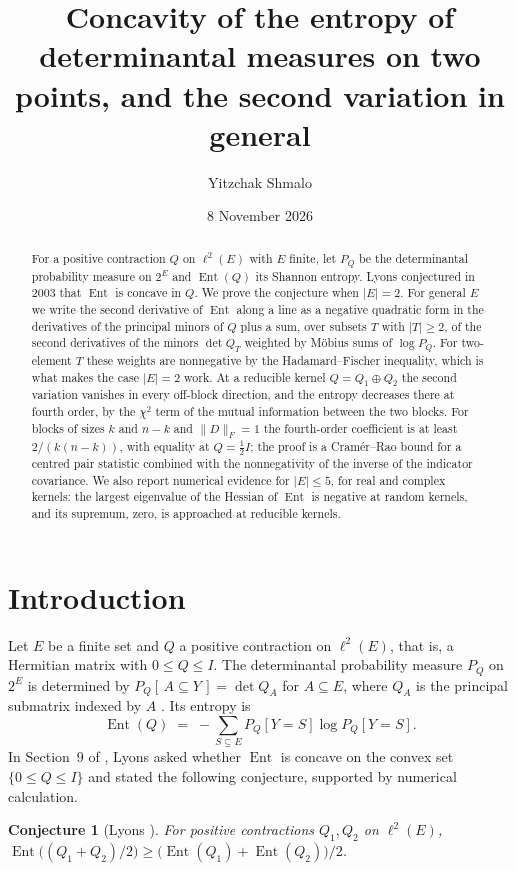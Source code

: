 \documentclass[11pt]{amsart}
\title[Concavity of determinantal entropy on two points]{Concavity of the entropy of determinantal measures on two points, and the second variation in general}
\author{Yitzchak Shmalo}
\date{8 November 2026}
\newtheorem{conjecture}[theorem]{Conjecture}
\theoremstyle{remark}
\numberwithin{equation}{section}
\newcommand{\Ent}{\operatorname{Ent}}
\begin{document}
\begin{abstract}
For a positive contraction $Q$ on $\ell^2(E)$ with $E$ finite, let $P_Q$ be the determinantal probability measure on $2^E$ and $\Ent(Q)$ its Shannon entropy. Lyons conjectured in 2003 that $\Ent$ is concave in $Q$. We prove the conjecture when $|E|=2$. For general $E$ we write the second derivative of $\Ent$ along a line as a negative quadratic form in the derivatives of the principal minors of $Q$ plus a sum, over subsets $T$ with $|T|\ge2$, of the second derivatives of the minors $\det Q_T$ weighted by M\"obius sums of $\log P_Q$. For two-element $T$ these weights are nonnegative by the Hadamard--Fischer inequality, which is what makes the case $|E|=2$ work. At a reducible kernel $Q=Q_1\oplus Q_2$ the second variation vanishes in every off-block direction, and the entropy decreases there at fourth order, by the $\chi^2$ term of the mutual information between the two blocks. For blocks of sizes $k$ and $n-k$ and $\|D\|_F=1$ the fourth-order coefficient is at least $2/(k(n-k))$, with equality at $Q=\frac12I$; the proof is a Cramér--Rao bound for a centred pair statistic combined with the nonnegativity of the inverse of the indicator covariance. We also report numerical evidence for $|E|\le5$, for real and complex kernels: the largest eigenvalue of the Hessian of $\Ent$ is negative at random kernels, and its supremum, zero, is approached at reducible kernels.
\end{abstract}
\maketitle

\section{Introduction}\label{sec:intro}

Let $E$ be a finite set and $Q$ a positive contraction on $\ell^2(E)$, that is, a Hermitian matrix with $0\le Q\le I$. The determinantal probability measure $P_Q$ on $2^E$ is determined by $P_Q[\,A\subseteq Y\,]=\det Q_A$ for $A\subseteq E$, where $Q_A$ is the principal submatrix indexed by $A$ \cite{Ly03}. Its entropy is
\[
\Ent(Q)\;=\;-\sum_{S\subseteq E}P_Q[Y=S]\log P_Q[Y=S].
\]
In Section~9 of \cite{Ly03}, Lyons asked whether $\Ent$ is concave on the convex set $\{0\le Q\le I\}$ and stated the following conjecture, supported by numerical calculation.

\begin{conjecture}[Lyons {\cite[Conjecture~9.2]{Ly03}}]\label{conj}
For positive contractions $Q_1,Q_2$ on $\ell^2(E)$, $\Ent\bigl((Q_1+Q_2)/2\bigr)\ge\bigl(\Ent(Q_1)+\Ent(Q_2)\bigr)/2$.
\end{conjecture}
\end{document}
